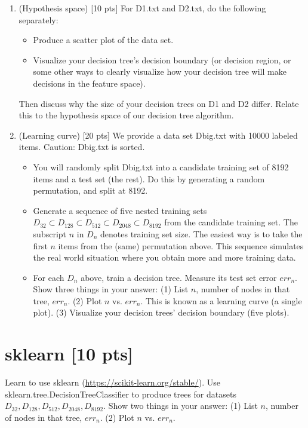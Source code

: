 \documentclass[a4paper]{article}
\theoremstyle{definition}
\begin{document}
\begin{enumerate}
\item (Hypothesis space)  [10 pts] For D1.txt and D2.txt, do the following separately:
  \begin{itemize}
  
  \item Produce a scatter plot of the data set.

  \item Visualize your decision tree's decision boundary (or decision region, or some other ways to clearly visualize how your decision tree will make decisions in the feature space).

  \end{itemize}
Then discuss why the size of your decision trees on D1 and D2 differ.  Relate this to the hypothesis space of our decision tree algorithm. \\

\item (Learning curve)  [20 pts] We provide a data set Dbig.txt with 10000 labeled items.  Caution: Dbig.txt is sorted.
  \begin{itemize}
  
  \item You will randomly split Dbig.txt into a candidate training set of 8192 items and a test set (the rest).  Do this by generating a random permutation, and split at 8192.
  
  \item Generate a sequence of five nested training sets $D_{32} \subset D_{128} \subset D_{512} \subset D_{2048} \subset D_{8192}$ from the candidate training set.  The subscript $n$ in $D_n$ denotes training set size.  The easiest way is to take the first $n$ items from the (same) permutation above.  This sequence simulates the real world situation where you obtain more and more training data.
  
  \item For each $D_n$ above, train a decision tree.  Measure its test set error $err_n$.  Show three things in your answer: (1) List $n$, number of nodes in that tree, $err_n$. (2) Plot $n$ vs. $err_n$.  This is known as a learning curve (a single plot). (3) Visualize your decision trees' decision boundary (five plots). \\
  \end{itemize}
  
\end{enumerate}

\section{sklearn [10 pts]}
Learn to use sklearn (\url{https://scikit-learn.org/stable/}).
Use sklearn.tree.DecisionTreeClassifier to produce trees for datasets $D_{32}, D_{128}, D_{512}, D_{2048}, D_{8192}$.  Show two things in your answer: (1) List $n$, number of nodes in that tree, $err_n$. (2) Plot $n$ vs. $err_n$.
\end{document}
